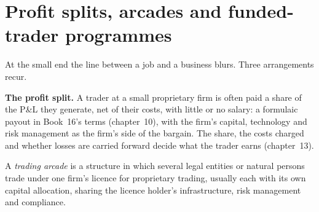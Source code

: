 \begin{omfigure}

\label{fig:in:medium-frequency-proprietary-shops:flows}
\end{omfigure}

\section{Profit splits, arcades and funded-trader programmes}

At the small end the line between a job and a business blurs. Three arrangements recur.

\textbf{The profit split.} A trader at a small proprietary firm is often paid a share of the P\&L they generate, net of
their costs, with little or no salary: a formulaic payout in Book~16's terms (chapter~10), with the firm's capital,
technology and risk management as the firm's side of the bargain. The share, the costs charged and whether losses are
carried forward decide what the trader earns (chapter~13).

\begin{definition}\label{def:in:medium-frequency-proprietary-shops:arcade}
A \emph{trading arcade} is a structure in which several legal entities or natural persons trade
under one firm's licence for proprietary trading, usually each with its own capital allocation, sharing the licence
holder's infrastructure, risk management and compliance.
\end{definition}

